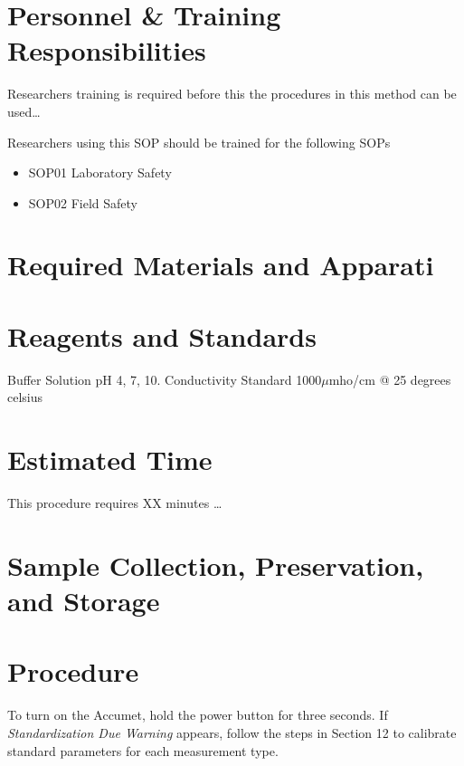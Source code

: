 \documentclass[12pt]{../SOP3_beta}\usepackage[]{graphicx}\usepackage[]{color}
\begin{document}
\section{Personnel \& Training Responsibilities}

\NP Researchers training is required before this the procedures in this method can be used\dots 

\NP Researchers using this SOP should be trained for the following SOPs

\begin{itemize}
  \item SOP01 Laboratory Safety
  \item SOP02 Field Safety
\end{itemize}

\section{Required Materials and Apparati}


\section{Reagents and Standards}

\NP Buffer Solution pH 4, 7, 10. 
\NP Conductivity Standard 1000$\mu$mho/cm @ 25 degrees celsius 

\section{Estimated Time}

\NP This procedure requires XX minutes \dots

\section{Sample Collection, Preservation, and Storage}

\section{Procedure}

\NP To turn on the Accumet, hold the power button for three seconds.
\NP If \emph{Standardization Due Warning} appears, follow the steps in Section 12 to calibrate standard parameters for each measurement type.
\end{document}
